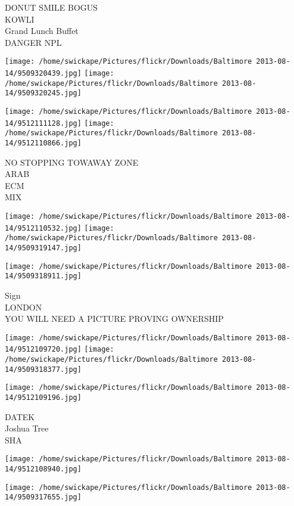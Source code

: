 \documentclass[10pt,letterpaper]{article}
\begin{document}
DONUT SMILE BOGUS\\
KOWLI\\
Grand Lunch Buffet\\
DANGER NPL\\
\pagebreak

\texttt{[image: /home/swickape/Pictures/flickr/Downloads/Baltimore 2013-08-14/9509320439.jpg]}
\texttt{[image: /home/swickape/Pictures/flickr/Downloads/Baltimore 2013-08-14/9509320245.jpg]}

\texttt{[image: /home/swickape/Pictures/flickr/Downloads/Baltimore 2013-08-14/9512111128.jpg]}
\texttt{[image: /home/swickape/Pictures/flickr/Downloads/Baltimore 2013-08-14/9512110866.jpg]}

NO STOPPING TOWAWAY ZONE\\
ARAB\\
ECM\\
MIX\\
\pagebreak

\texttt{[image: /home/swickape/Pictures/flickr/Downloads/Baltimore 2013-08-14/9512110532.jpg]}
\texttt{[image: /home/swickape/Pictures/flickr/Downloads/Baltimore 2013-08-14/9509319147.jpg]}

\vspace{0.25in}
\texttt{[image: /home/swickape/Pictures/flickr/Downloads/Baltimore 2013-08-14/9509318911.jpg]}

Sign\\
LONDON\\
YOU WILL NEED A PICTURE PROVING OWNERSHIP\\
\pagebreak

\texttt{[image: /home/swickape/Pictures/flickr/Downloads/Baltimore 2013-08-14/9512109720.jpg]}
\texttt{[image: /home/swickape/Pictures/flickr/Downloads/Baltimore 2013-08-14/9509318377.jpg]}

\texttt{[image: /home/swickape/Pictures/flickr/Downloads/Baltimore 2013-08-14/9512109196.jpg]}

DATEK\\
Joshua Tree\\
SHA\\
\pagebreak

\texttt{[image: /home/swickape/Pictures/flickr/Downloads/Baltimore 2013-08-14/9512108940.jpg]}

\vspace{0.25in}
\texttt{[image: /home/swickape/Pictures/flickr/Downloads/Baltimore 2013-08-14/9509317655.jpg]}
\end{document}

